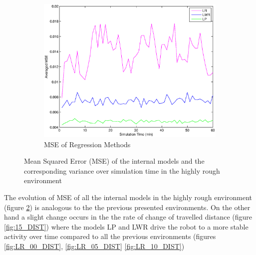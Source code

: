 \documentclass[msc,ai,logo]{infthesis}
\begin{document}
\begin{figure}[H]
\begin{subfigure}[b]{0.5\textwidth}
                \includegraphics[width=\textwidth]{LR_15_MSE.eps}
                \caption{MSE of Regression Methods}
               \label{fig:LR_15_MSE}  
        \end{subfigure}
        \caption{Mean Squared Error (MSE) of the internal models and the corresponding variance over simulation time in the highly rough environment}
          \label{fig:15_MSE}
\end{figure}

The evolution of MSE of all the internal models in the highly rough environment (figure \ref{fig:15_MSE}) is analogous to the the previous presented environments. On the other hand a slight change occurs in the the rate of change of travelled distance (figure \ref{fig:15_DIST}) where the models LP and LWR drive the robot to a more stable activity over time compared to all the previous environments (figures \ref{fig:LR_00_DIST}, \ref{fig:LR_05_DIST} \ref{fig:LR_10_DIST}) 
\end{document}
